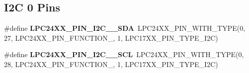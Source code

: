 \subsection*{I2C 0 Pins}
\begin{DoxyCompactItemize}
\item 
\mbox{\label{group__lpc24xx__io_gaab4a328c1041cc46e3cb8d9568a799bd}} 
\#define {\bfseries L\+P\+C24\+X\+X\+\_\+\+P\+I\+N\+\_\+\+I2\+C\+\_\+\_\+\+S\+DA}~L\+P\+C24\+X\+X\+\_\+\+P\+I\+N\+\_\+\+W\+I\+T\+H\+\_\+\+T\+Y\+PE(0, 27, L\+P\+C24\+X\+X\+\_\+\+P\+I\+N\+\_\+\+F\+U\+N\+C\+T\+I\+O\+N\+\_, 1, L\+P\+C17\+X\+X\+\_\+\+P\+I\+N\+\_\+\+T\+Y\+P\+E\+\_\+\+I2C)
\item 
\mbox{\label{group__lpc24xx__io_ga39481d1acc31e9fe4f21784ceb58b86c}} 
\#define {\bfseries L\+P\+C24\+X\+X\+\_\+\+P\+I\+N\+\_\+\+I2\+C\+\_\+\_\+\+S\+CL}~L\+P\+C24\+X\+X\+\_\+\+P\+I\+N\+\_\+\+W\+I\+T\+H\+\_\+\+T\+Y\+PE(0, 28, L\+P\+C24\+X\+X\+\_\+\+P\+I\+N\+\_\+\+F\+U\+N\+C\+T\+I\+O\+N\+\_, 1, L\+P\+C17\+X\+X\+\_\+\+P\+I\+N\+\_\+\+T\+Y\+P\+E\+\_\+\+I2C)
\end{DoxyCompactItemize}
